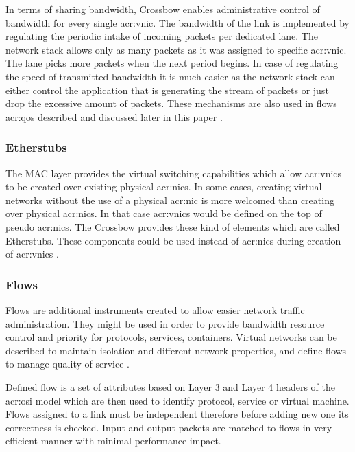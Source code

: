\documentclass[11pt,openany]{book}
\begin{document}
          In terms of sharing bandwidth, Crossbow enables administrative control of bandwidth for every single
          \gls{acr:vnic}. The bandwidth of the link is implemented by regulating the periodic intake of incoming packets
          per dedicated lane. The network stack allows only as many packets as it was assigned to specific
          \gls{acr:vnic}. The lane picks more packets when the next period begins. In case of regulating the speed of
          transmitted bandwidth it is much easier as the network stack can either control the application that is
          generating the stream of packets or just drop the excessive amount of packets. These mechanisms are also used
          in flows \gls{acr:qos} described and discussed later in this paper \cite{crossbow}.


        \subsubsection{Etherstubs}

          The MAC layer provides the virtual switching capabilities which allow \gls{acr:vnic}s to be created over
          existing physical \gls{acr:nic}s. In some cases, creating virtual networks without the use of a physical
          \gls{acr:nic} is more welcomed than creating over physical \gls{acr:nic}s. In that case \gls{acr:vnic}s would
          be defined on the top of pseudo \gls{acr:nic}s.  The Crossbow provides these kind of elements which are called
          Etherstubs. These components could be used instead of \gls{acr:nic}s during creation of \gls{acr:vnic}s
          \cite{crossbow}.


        \subsubsection{Flows}

          Flows are additional instruments created to allow easier network traffic administration. They might be used in
          order to provide bandwidth resource control and priority for protocols, services, containers. Virtual networks
          can be described to maintain isolation and different network properties, and define flows to manage quality of
          service \cite{network_virtualization}.

          Defined flow is a set of attributes based on Layer 3 and Layer 4 headers of the \gls{acr:osi} model which are
          then used to identify protocol, service or virtual machine. Flows assigned to a link must be independent
          therefore before adding new one its correctness is checked. Input and output packets are matched to flows in
          very efficient manner with minimal performance impact.
\end{document}
